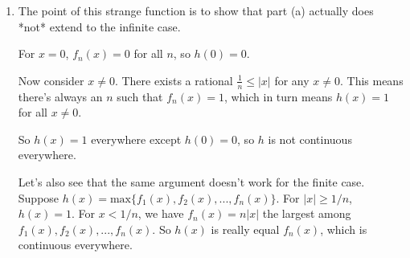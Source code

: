 \documentclass{oxmathproblems}
\begin{document}
\begin{questions}
\begin{solution}
\begin{enumerate}[label=(\alph*)]
    Since $a$ and $b$ are continuous, there exists $\delta$ such that $a(x) \in V_{\epsilon}\{a(c)\}$ and $b_{x} \in V_{\epsilon}\{b(c)\}$. WLOG $b(c) \geq a(c)$.
    
    Since $b(x) < b(c) + \epsilon$, then $\text{max}\{a(x), b(x)\} < b(c) + \epsilon$

    Since $b(x) > b(c) - \epsilon$ and $\text{max}\{a(x), b(x)\} \geq b(x)$, then $\text{max}\{a(x), b(x)\} > b(c) - \epsilon$

    Combining them gives $b(c)-\epsilon < \text{max}\{a(x), b(x)\} < b(c)+\epsilon$. By assumption $\text{max}\{a(c), b(c)\} = b(c)$. Then $|\text{max}\{a(x), b(x)\} - \text{max}\{a(c), b(c)\}| < \epsilon$.
    
    Alternatively, use the given identity. By the Algebraic Continuity Theorem, $(a+b), (a-b)$ and $|a-b|$ are all continuous, so the $max$ function is continuous.

    --- Extra note ---

    I used the $\epsilon-\delta$ proof because I feel unsatisfied using the identity. Had it not been given, I wouldn't have come up with it. I wouldn't think to associate a $max$ function with an algebraic formula.

    But this formula actually has a simple geometric interpretation. To get the max between two numbers, start from their midpoint, then add half their distance. Likewise, to get the min, subtract half their distance.
    It wasn't immediately obvious because the way it's written in the problem statement, the $\frac{1}{2}$ was factored out.
  
    \item The point of this strange function is to show that part (a) actually does *not* extend to the infinite case.
    
    For $x=0$, $f_{n}(x)=0$ for all $n$, so $h(0)=0$.
    
    Now consider $x \neq 0$. There exists a rational $\frac{1}{n} \leq |x|$ for any $x \neq 0$. This means there's always an $n$ such that $f_{n}(x)=1$, which in turn means $h(x)=1$ for all $x \neq 0$.

    So $h(x)=1$ everywhere except $h(0)=0$, so $h$ is not continuous everywhere.

    Let's also see that the same argument doesn't work for the finite case. Suppose $h(x)=\text{max}\{f_{1}(x), f_{2}(x), ..., f_{n}(x)\}$. For $|x| \geq 1/n$, $h(x)=1$. For $x < 1/n$,
    we have $f_{n}(x)=n|x|$ the largest among $f_{1}(x), f_{2}(x), ..., f_{n}(x)$. So $h(x)$ is really equal $f_{n}(x)$, which is continuous everywhere.
  \end{enumerate}
\end{solution}



\end{questions}
\end{document}

